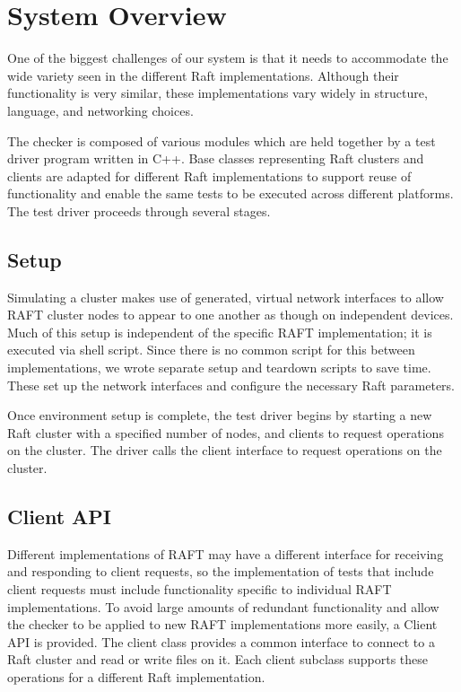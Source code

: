 \documentclass[UTF8]{article}
\begin{document}
\section{System Overview}
One of the biggest challenges of our system is that it needs to accommodate the wide variety seen in the different Raft implementations. Although their functionality is very similar, these implementations vary widely in structure, language, and networking choices.

The checker is composed of various modules which are held together by a test driver program written in C++. Base classes representing Raft clusters and clients are adapted for different Raft implementations to support reuse of functionality and enable the same tests to be executed across different platforms. The test driver proceeds through several stages.

\subsection{Setup}

Simulating a cluster makes use of generated, virtual network interfaces to allow RAFT cluster nodes to appear to one another as though on independent devices. Much of this setup is independent of the specific RAFT implementation; it is executed via shell script. Since there is no common script for this between implementations, we wrote separate setup and teardown scripts to save time. These set up the network interfaces and configure the necessary Raft parameters.

Once environment setup is complete, the test driver begins by starting a new Raft cluster with a specified number of nodes, and clients to request operations on the cluster. The driver calls the client interface to request operations on the cluster.

\subsection{Client API}

Different implementations of RAFT may have a different interface for receiving and responding to client requests, so the implementation of tests that include client requests must include functionality specific to individual RAFT implementations. To avoid large amounts of redundant functionality and allow the checker to be applied to new RAFT implementations more easily, a Client API is provided. The client class provides a common interface to connect to a Raft cluster and read or write files on it. Each client subclass supports these operations for a different Raft implementation.
\end{document}
